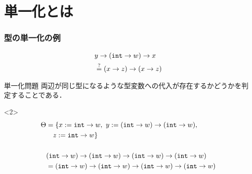 \section{単一化とは}

\begin{frame}
  \frametitle{型の単一化の例}
  \begin{align*}
    &y \to (\mbox{\texttt{int}} \to w) \to x \\
    &\stackrel?= (x \to z) \to (x \to z)
  \end{align*}

  \begin{exampleblock}{単一化問題}
    両辺が同じ型になるような型変数への代入が存在するかどうかを判定することである．
  \end{exampleblock}

  \vspace{-1zh}
  \begin{visibleenv}<2>
    \begin{align*}
      \Theta &= \{x := \mbox{\texttt{int}} \to w,~ y := (\mbox{\texttt{int}} \to w) \to (\mbox{\texttt{int}} \to w),~\\
             &~~~z := \mbox{\texttt{int}} \to w \} \\
      \\
             &  (\mbox{\texttt{int}} \to w) \to (\mbox{\texttt{int}} \to w) \to (\mbox{\texttt{int}} \to w) \to (\mbox{\texttt{int}} \to w) \\
      &= (\mbox{\texttt{int}} \to w) \to (\mbox{\texttt{int}} \to w ) \to (\mbox{\texttt{int}} \to w ) \to (\mbox{\texttt{int}} \to w )
    \end{align*}
  \end{visibleenv}
\end{frame}

